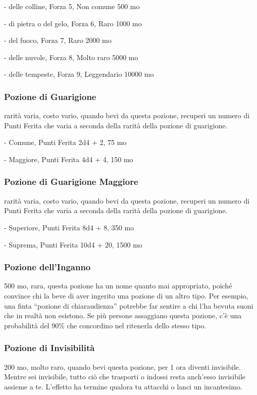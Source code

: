 \begin{multicols}{2}
	- delle colline, Forza 5, Non comune 500 mo

	- di pietra o del gelo, Forza 6, Raro 1000 mo

	- del fuoco, Forza 7, Raro 2000 mo

	- delle nuvole, Forza 8, Molto raro 5000 mo

	- delle tempeste, Forza 9, Leggendario 10000 mo

	\subsubsection*{Pozione di Guarigione}
	rarità varia, costo vario, quando bevi da questa pozione, recuperi un numero di Punti Ferita che varia a seconda della rarità della pozione di guarigione.

	- Comune, Punti Ferita 2d4 + 2, 75 mo

	- Maggiore, Punti Ferita 4d4 + 4, 150 mo

	\subsubsection*{Pozione di Guarigione Maggiore}
	rarità varia, costo vario, quando bevi da questa pozione, recuperi un numero di Punti Ferita che varia a seconda della rarità della pozione di guarigione.

	- Superiore, Punti Ferita 8d4 + 8, 350 mo

	- Suprema, Punti Ferita 10d4 + 20, 1500 mo

	\subsubsection*{Pozione dell'Inganno}

	500 mo, rara, questa pozione ha un nome quanto mai appropriato, poiché convince chi la beve di aver ingerito una pozione di un altro tipo. Per esempio, una finta “pozione di chiaraudienza” potrebbe far sentire a chi l’ha bevuta suoni che in realtà non esistono. Se più persone assaggiano questa pozione, c'è una probabilità del 90\% che concordino nel ritenerla dello stesso tipo.

	\subsubsection*{Pozione di Invisibilità}
	200 mo, molto raro, quando bevi questa pozione, per 1 ora diventi invisibile. Mentre sei invisibile, tutto ciò che trasporti o indossi resta anch'esso invisibile assieme a te. L'effetto ha termine qualora tu attacchi o lanci un incantesimo.


\end{multicols}
